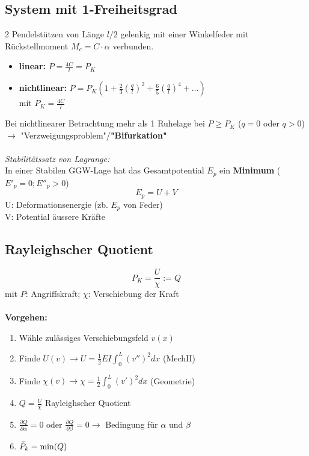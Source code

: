     \subsection{System mit 1-Freiheitsgrad}
        2 Pendelstützen von Länge $l/2$ gelenkig mit einer Winkelfeder mit Rückstellmoment $M_c=C\cdot\alpha$ verbunden.
        \begin{itemize}
            \item \textbf{linear:} $P=\frac{4C}{l}=P_K$
            \item \textbf{nichtlinear:} $P=P_K\left(1+\frac{2}{3}\left(\frac{q}{l}\right)^2+\frac{6}{5}\left(\frac{q}{l}\right)^4+\dots\right)$ \\mit $P_K=\frac{4C}{l}$
        \end{itemize}
        Bei nichtlinearer Betrachtung mehr als 1 Ruhelage bei $P\geqslant P_K$ ($q=0$ oder $q >0$) $\rightarrow$ "Verzweigungsproblem"/\textbf{"Bifurkation"}\\\\
        \textit{Stabilitätssatz von Lagrange:}\\
        In einer Stabilen GGW-Lage hat das Gesamtpotential $E_p$ ein \textbf{Minimum} ($E'_p=0; E''_p>0$)
        \vspace{-2mm}\[E_p = U+V\]
        U: Deformationsenergie (zb. $E_p$ von Feder) 
        \\V: Potential äussere Kräfte
    \subsection{Rayleighscher Quotient}
        \[P_K=\frac{U}{\chi}:=Q\]
        mit $P$: Angriffskraft; \quad $\chi$: Verschiebung der Kraft\\\\
        \textbf{Vorgehen:}
        \begin{enumerate}
            \item Wähle zulässiges Verschiebungsfeld $v(x)$
            \item Finde $\displaystyle U(v) \rightarrow U = \frac{1}{2}EI\int_{0}^{L}(v'')^2dx$ \quad(MechII)
            \item Finde $\displaystyle \chi(v) \rightarrow \chi=\frac{1}{2}\int_{0}^{L}(v')^2dx$ \qquad(Geometrie)
            \item $Q=\frac{U}{\chi}$ Rayleighscher Quotient
            \item $\displaystyle\frac{\partial Q}{\partial\alpha}=0 \textrm{ oder } \frac{\partial Q}{\partial\beta}=0 \rightarrow$ Bedingung für $\alpha \textrm{ und } \beta$
            \item $\Tilde{P}_k=\textrm{min}(Q)$
            
        \end{enumerate}
        